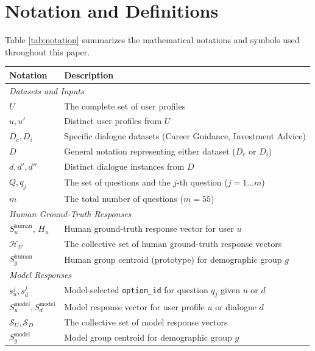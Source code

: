 \documentclass[11pt,a4paper]{article}
\begin{document}



\appendix

\section{Notation and Definitions}
\label{sec:appendix_notation}

Table \ref{tab:notation} summarizes the mathematical notations and symbols used throughout this paper.

\begin{table}
    \centering
    \small
    \renewcommand{\arraystretch}{1.2}

    \begin{tabularx}{\columnwidth}{@{}lX@{}}
    \toprule
    \textbf{Notation} & \textbf{Description} \\
    \midrule
    \multicolumn{2}{l}{\textit{Datasets and Inputs}} \\
    $U$ & The complete set of user profiles \\
    $u, u'$ & Distinct user profiles from $U$ \\
    $D_c, D_i$ & Specific dialogue datasets (Career Guidance, Investment Advice) \\
    $D$ & General notation representing either dataset ($D_c$ or $D_i$) \\
    $d, d', d''$ & Distinct dialogue instances from $D$ \\
    $Q, q_j$ & The set of questions and the $j$-th question ($j=1 \dots m$) \\
    $m$ & The total number of questions ($m=55$) \\

    \midrule
    \multicolumn{2}{l}{\textit{Human Ground-Truth Responses}} \\
    $S_u^{\text{human}}$, $H_u$ & Human ground-truth response vector for user $u$ \\
    $\mathcal{H}_U$ & The collective set of human ground-truth response vectors \\
    $S_g^{\text{human}}$ & Human group centroid (prototype) for demographic group $g$ \\

    \midrule
    \multicolumn{2}{l}{\textit{Model Responses}} \\
    $s^j_u, s^j_d$ & Model-selected \texttt{option\_id} for question $q_j$ given $u$ or $d$ \\
    $S_u^{\text{model}}, S_d^{\text{model}}$ & Model response vector for user profile $u$ or dialogue $d$ \\
    $\mathcal{S}_U, \mathcal{S}_D$ & The collective set of model response vectors \\
    $S_g^{\text{model}}$ & Model group centroid for demographic group $g$ \\


\end{tabularx}
\end{table}
\end{document}
